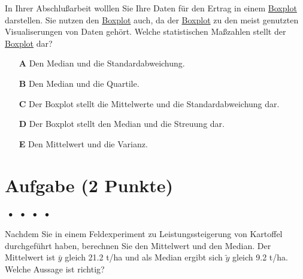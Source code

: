 \documentclass[a4paper, 9pt]{scrartcl}\usepackage[]{graphicx}\usepackage[]{xcolor}
\begin{document}
In Ihrer Abschlußarbeit wolllen Sie Ihre Daten für den Ertrag in einem \uline{Boxplot} darstellen. Sie nutzen den \uline{Boxplot} auch, da der \uline{Boxplot} zu den meist genutzten Visualiserungen von Daten gehört. Welche statistischen Maßzahlen stellt der \uline{Boxplot} dar?

 



\begin{enumerate}
\item [\textbf{A} \msquare] Den Median und die Standardabweichung.
\item [\textbf{B} \msquare] Den Median und die Quartile.
\item [\textbf{C} \msquare] Der Boxplot stellt die Mittelwerte und die Standardabweichung dar.
\item [\textbf{D} \msquare] Der Boxplot stellt den Median und die Streuung dar.
\item [\textbf{E} \msquare] Den Mittelwert und die Varianz.
\end{enumerate} 

\section{Aufgabe \hfill (2 Punkte)}

\ifcollection
\begin{flushright}
\tiny\vspace{-2Ex}
\textbf{\examinhaltstart}
\exammodulemathstat $\;\bullet$
\exammodulestat $\;\bullet$
\exammodulestatbbv $\;\bullet$
\exammodulestatversuch $\;\bullet$
\exammodulebiostat
\vspace{-1Ex}
\end{flushright}
\fi




Nachdem Sie in einem Feldexperiment zu Leistungssteigerung von Kartoffel durchgeführt haben, berechnen Sie den Mittelwert und den Median. Der Mittelwert ist $\bar{y}$ gleich 21.2 t/ha und als Median ergibt sich $\tilde{y}$ gleich 9.2 t/ha. Welche Aussage ist richtig?
\end{document}
